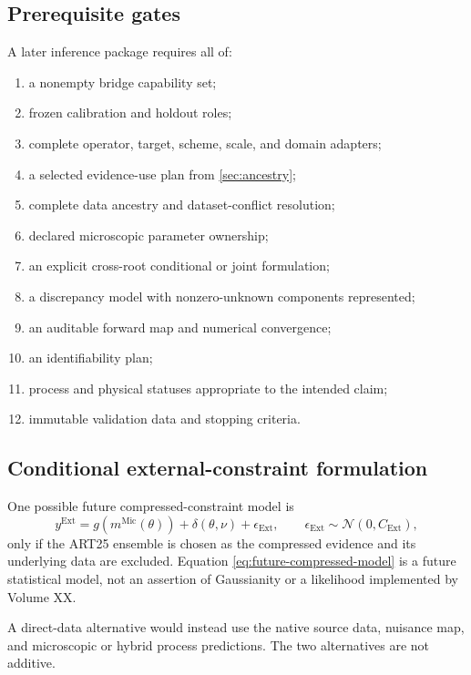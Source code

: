 \documentclass[11pt]{article}
\newcommand{\Ext}{\ensuremath{\mathrm{Ext}}}
\newcommand{\Mic}{\ensuremath{\mathrm{Mic}}}
\begin{document}
\subsection{Prerequisite gates}

A later inference package requires all of:
\begin{enumerate}
\item a nonempty bridge capability set;
\item frozen calibration and holdout roles;
\item complete operator, target, scheme, scale, and domain adapters;
\item a selected evidence-use plan from \cref{sec:ancestry};
\item complete data ancestry and dataset-conflict resolution;
\item declared microscopic parameter ownership;
\item an explicit cross-root conditional or joint formulation;
\item a discrepancy model with nonzero-unknown components represented;
\item an auditable forward map and numerical convergence;
\item an identifiability plan;
\item process and physical statuses appropriate to the intended claim;
\item immutable validation data and stopping criteria.
\end{enumerate}

\subsection{Conditional external-constraint formulation}

One possible future compressed-constraint model is
\begin{equation}
 y^{\Ext}
 =
 g\!\left(m^{\Mic}(\theta)\right)
 +\delta(\theta,\nu)
 +\epsilon_{\Ext},
 \qquad
 \epsilon_{\Ext}\sim\mathcal N(0,C_{\Ext}),
 \label{eq:future-compressed-model}
\end{equation}
only if the ART25 ensemble is chosen as the compressed evidence and its underlying data are excluded.  Equation \eqref{eq:future-compressed-model} is a future statistical model, not an assertion of Gaussianity or a likelihood implemented by Volume XX.

A direct-data alternative would instead use the native source data, nuisance map, and microscopic or hybrid process predictions.  The two alternatives are not additive.
\end{document}
